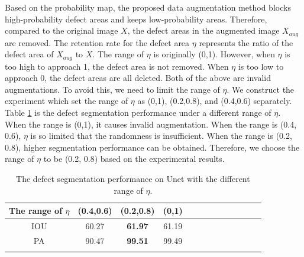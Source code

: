 \documentclass[sn-mathphys]{sn-jnl}%
\theoremstyle{thmstyleone}%
\theoremstyle{thmstyletwo}%
\theoremstyle{thmstylethree}%
\begin{document}
Based on the probability map, the proposed data augmentation method blocks high-probability defect areas and keeps low-probability areas. Therefore, compared to the original image $X$, the defect areas in the augmented image $X_{aug}$ are removed. The retention rate for the defect area $\eta$ represents the ratio of the defect area of $X_{aug}$ to $X$. The range of $\eta$ is originally (0,1). However, when $\eta$ is too high to approach 1, the defect area is not removed. When $\eta$ is too low to approach 0, the defect areas are all deleted. Both of the above are invalid augmentations. To avoid this, we need to limit the range of $\eta$. We construct the experiment which set the range of $\eta$ as (0,1), (0.2,0.8), and (0.4,0.6) separately. Table \ref{tabrange} is the defect segmentation performance under a different range of $\eta$. When the range is (0,1), it causes invalid augmentation. When the range is (0.4, 0.6), $\eta$ is so limited that the randomness is insufficient. When the range is (0.2, 0.8), higher segmentation performance can be obtained. Therefore, we choose the range of $\eta$ to be (0.2, 0.8) based on the experimental results.

\begin{table}[h]
\begin{center}

\caption{The defect segmentation performance on Unet with the different range of $\eta$.}\label{tabrange}%
\begin{tabular}{ccccccccccccc}
\toprule  
The range of $\eta$ &(0.4,0.6)&(0.2,0.8)& (0,1)\\
\midrule
IOU &60.27 &	\textbf{61.97}	 &61.19\\
PA &90.47	 &\textbf{99.51}	 &99.49\\
\botrule

\end{tabular}
\end{center}
\end{table}
\end{document}
